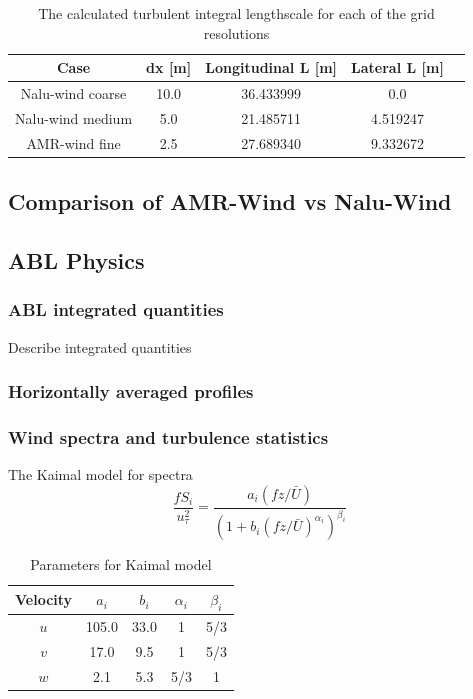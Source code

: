 \begin{table}
\caption{\label{tab:GridStudyLscale} The calculated turbulent integral
  lengthscale for each of the grid resolutions} \centering
\begin{tabular}{ccccc}
  \hline
  Case              & dx [m] & Longitudinal L [m] & Lateral L [m] \\
  \hline
  Nalu-wind coarse  &  10.0  & 36.433999          & 0.0        \\
  Nalu-wind medium  &   5.0  & 21.485711          & 4.519247   \\
  AMR-wind fine     &   2.5  & 27.689340          & 9.332672   \\
\hline
\end{tabular}
\end{table}

\subsection{Comparison of AMR-Wind vs Nalu-Wind}

\subsection{ABL Physics}

\subsubsection{ABL integrated quantities}
Describe integrated quantities

\subsubsection{Horizontally averaged profiles}

\subsubsection{Wind spectra and turbulence statistics}

The Kaimal model for spectra \cite{kaimal1973turbulence, cheynet2017spectral}
\begin{equation}
  \label{eq:kaimal}
  \frac{fS_i}{u_\tau^2} = \frac{a_i(fz/\bar{U})}{\left(1+b_i(fz/\bar{U})^{\alpha_i}\right)^{\beta_i}}
\end{equation}

\begin{table}
\caption{\label{tab:KaimalParameters} Parameters for Kaimal model}
\centering
\begin{tabular}{ccccc}
  \hline
  Velocity & $a_i$ & $b_i$ & $\alpha_i$  & $\beta_i$ \\
  \hline
  $u$      & 105.0 & 33.0  & 1           & 5/3  \\
  $v$      &  17.0 &  9.5  & 1           & 5/3  \\
  $w$      &   2.1 &  5.3  & 5/3         &   1  \\
\hline
\end{tabular}
\end{table}

